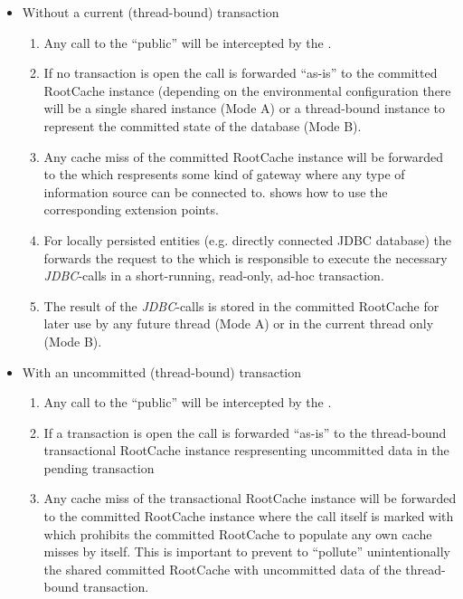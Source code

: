 \begin{itemize}
	\item Without a current (thread-bound) transaction
		\begin{enumerate}
			\item Any call to the ``public''  will be intercepted by the .
			\item If no transaction is open the call is forwarded ``as-is'' to the committed RootCache instance (depending on the environmental configuration there will be a single shared instance (Mode A) or a thread-bound instance to represent the committed state of the database (Mode B).
			\item Any cache miss of the committed RootCache instance will be forwarded to the  which respresents some kind of gateway where any type of information source can be connected to.  shows how to use the corresponding extension points.
			\item For locally persisted entities (e.g. directly connected JDBC database) the  forwards the request to the  which is responsible to execute the necessary \emph{JDBC}-calls in a short-running, read-only, ad-hoc transaction.
			\item The result of the \emph{JDBC}-calls is stored in the committed RootCache for later use by any future thread (Mode A) or in the current thread only (Mode B).
		\end{enumerate}
	\item With an uncommitted (thread-bound) transaction
		\begin{enumerate}
			\item Any call to the ``public''  will be intercepted by the .
			\item If a transaction is open the call is forwarded ``as-is'' to the thread-bound transactional RootCache instance respresenting uncommitted data in the pending transaction
			\item Any cache miss of the transactional RootCache instance will be forwarded to the committed RootCache instance where the call itself is marked with  which prohibits the committed RootCache to populate any own cache misses by itself. This is important to prevent to ``pollute'' unintentionally the shared committed RootCache with uncommitted data of the thread-bound transaction.

\end{enumerate}
\end{itemize}
